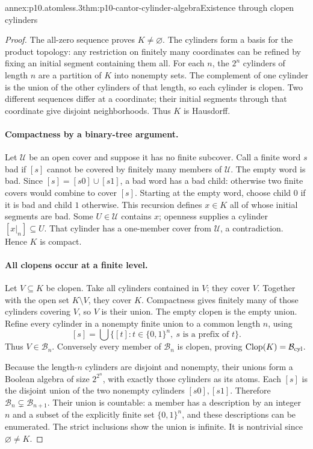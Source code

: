 \begin{annexitem}{annex:p10.atomless.3}{thm:p10-cantor-cylinder-algebra}{Existence through clopen cylinders}
\begin{proof}
The all-zero sequence proves \(K\ne\varnothing\).
The cylinders form a basis for the product topology: any restriction
on finitely many coordinates can be refined by fixing an initial
segment containing them all.
For each \(n\), the \(2^n\) cylinders of length \(n\) are a
partition of \(K\) into nonempty sets.
The complement of one cylinder is the union of the other
cylinders of that length, so each cylinder is clopen.
Two different sequences differ at a coordinate; their initial
segments through that coordinate give disjoint neighborhoods.
Thus \(K\) is Hausdorff.

\paragraph{Compactness by a binary-tree argument.}
Let \(\mathcal U\) be an open cover and suppose it has no finite
subcover.
Call a finite word \(s\) bad if \([s]\) cannot be covered by
finitely many members of \(\mathcal U\).
The empty word is bad.
Since \([s]=[s0]\cup[s1]\), a bad word has a bad child:
otherwise two finite covers would combine to cover \([s]\).
Starting at the empty word, choose child \(0\) if it is bad
and child \(1\) otherwise.
This recursion defines \(x\in K\) all of whose initial segments
are bad.
Some \(U\in\mathcal U\) contains \(x\); openness supplies a
cylinder \([x|_n]\subseteq U\).
That cylinder has a one-member cover from \(\mathcal U\),
a contradiction.
Hence \(K\) is compact.

\paragraph{All clopens occur at a finite level.}
Let \(V\subseteq K\) be clopen.
Take all cylinders contained in \(V\); they cover \(V\).
Together with the open set \(K\setminus V\), they cover \(K\).
Compactness gives finitely many of those cylinders covering \(V\),
so \(V\) is their union.
The empty clopen is the empty union.
Refine every cylinder in a nonempty finite union to a common
length \(n\), using
\[
 [s]=\bigcup\{[t]:t\in\{0,1\}^n,\ s\text{ is a prefix of }t\}.
\]
Thus \(V\in\mathcal B_n\).
Conversely every member of \(\mathcal B_n\) is clopen, proving
\(\operatorname{Clop}(K)=\mathcal B_{\rm cyl}\).

Because the length-\(n\) cylinders are disjoint and nonempty,
their unions form a Boolean algebra of size \(2^{2^n}\),
with exactly those cylinders as its atoms.
Each \([s]\) is the disjoint union of the two nonempty
cylinders \([s0],[s1]\).
Therefore
\(\mathcal B_n\subsetneq\mathcal B_{n+1}\).
Their union is countable: a member has a description by an
integer \(n\) and a subset of the explicitly finite set
\(\{0,1\}^n\), and these descriptions can be enumerated.
The strict inclusions show the union is infinite.
It is nontrivial since \(\varnothing\ne K\).


\end{proof}
\end{annexitem}
